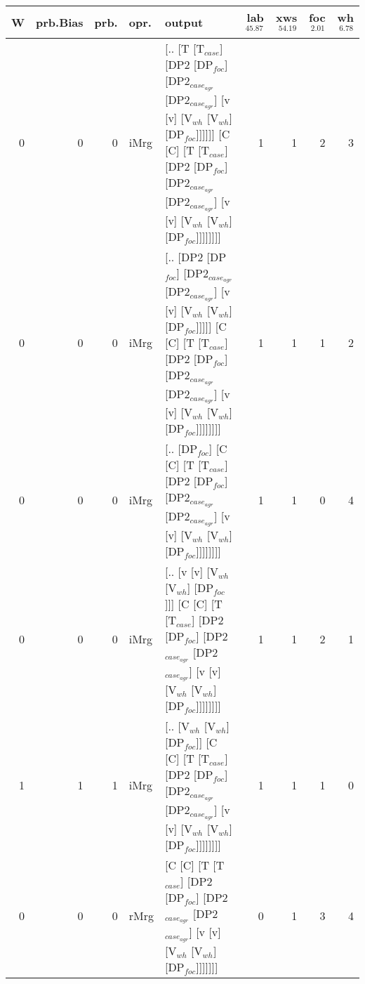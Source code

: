\begin{tabularx}{\linewidth}{rrrlXrrrr}
\hline
   W &   prb.Bias &   prb. & opr.   & output                                                                                                                                                                                         &   lab$^{45.87}$ &   xws$^{54.19}$ &   foc$^{2.01}$ &   wh$^{6.78}$ \\
\hline
   0 &       0 &   0 & iMrg & [.. [T [T$_{case}$] [DP2 [DP$_{foc}$] [DP2$_{case_{agr}}$ [DP2$_{case_{agr}}$] [v [v] [V$_{wh}$ [V$_{wh}$] [DP$_{foc}$]]]]]] [C [C] [T [T$_{case}$] [DP2 [DP$_{foc}$] [DP2$_{case_{agr}}$ [DP2$_{case_{agr}}$] [v [v] [V$_{wh}$ [V$_{wh}$] [DP$_{foc}$]]]]]]]] &             1 &             1 &          2 &        3 \\
   0 &       0 &   0 & iMrg & [.. [DP2 [DP$_{foc}$] [DP2$_{case_{agr}}$ [DP2$_{case_{agr}}$] [v [v] [V$_{wh}$ [V$_{wh}$] [DP$_{foc}$]]]]] [C [C] [T [T$_{case}$] [DP2 [DP$_{foc}$] [DP2$_{case_{agr}}$ [DP2$_{case_{agr}}$] [v [v] [V$_{wh}$ [V$_{wh}$] [DP$_{foc}$]]]]]]]]              &             1 &             1 &          1 &        2 \\
   0 &       0 &   0 & iMrg & [.. [DP$_{foc}$] [C [C] [T [T$_{case}$] [DP2 [DP$_{foc}$] [DP2$_{case_{agr}}$ [DP2$_{case_{agr}}$] [v [v] [V$_{wh}$ [V$_{wh}$] [DP$_{foc}$]]]]]]]]                                                                                 &             1 &             1 &          0 &        4 \\
   0 &       0 &   0 & iMrg & [.. [v [v] [V$_{wh}$ [V$_{wh}$] [DP$_{foc}$]]] [C [C] [T [T$_{case}$] [DP2 [DP$_{foc}$] [DP2$_{case_{agr}}$ [DP2$_{case_{agr}}$] [v [v] [V$_{wh}$ [V$_{wh}$] [DP$_{foc}$]]]]]]]]                                                           &             1 &             1 &          2 &        1 \\
   1 &       1 &   1 & iMrg & [.. [V$_{wh}$ [V$_{wh}$] [DP$_{foc}$]] [C [C] [T [T$_{case}$] [DP2 [DP$_{foc}$] [DP2$_{case_{agr}}$ [DP2$_{case_{agr}}$] [v [v] [V$_{wh}$ [V$_{wh}$] [DP$_{foc}$]]]]]]]]                                                                   &             1 &             1 &          1 &        0 \\
   0 &       0 &   0 & rMrg & [C [C] [T [T$_{case}$] [DP2 [DP$_{foc}$] [DP2$_{case_{agr}}$ [DP2$_{case_{agr}}$] [v [v] [V$_{wh}$ [V$_{wh}$] [DP$_{foc}$]]]]]]]                                                                                               &             0 &             1 &          3 &        4 \\
\hline
\end{tabularx}\endgroup\\
